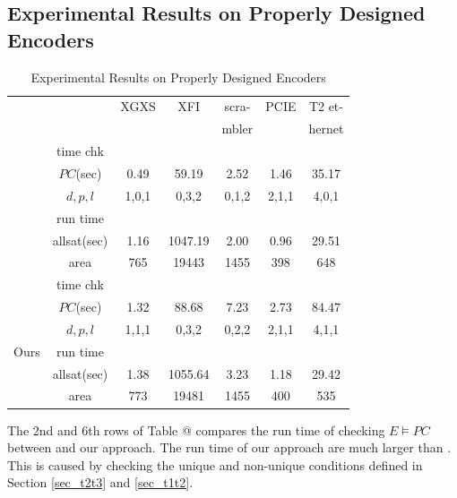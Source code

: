 \documentclass[journal]{IEEEtran}
\makeatletter
\newcommand{\Rmnum}[1]{\expandafter\@slowromancap\romannumeral #1@}
\makeatother
\begin{document}
\subsection{Experimental Results on Properly Designed Encoders}
\begin{table}[b]
\centering
\caption{Experimental Results on Properly Designed Encoders}
\begin{tabular}{|c|c|c|c|c|c|c|}
\hline
&                                        &XGXS     &XFI       &scra-     &PCIE    &T2 et-\\
&                                        &         &          &mbler     &        &hernet\\ \hline
&time chk                           &&&&&\\
&$PC$(sec)                               &0.49     &59.19     &2.52      &1.46    &35.17\\\cline{2-7}
&$d,p,l$                                 &1,0,1    &0,3,2     &0,1,2     &2,1,1   &4,0,1         \\ \cline{2-7}
\cite{ShengYuShen:iccad09}&run time      &         &          &          &        &              \\
&allsat(sec)                             &1.16     &1047.19   &2.00      &0.96    &29.51       \\\cline{2-7}
&area                                    &765      &19443     &1455      &398     &648           \\ \hline\hline
&time chk                         &&&&&\\
&$PC$(sec)                               &1.32     &88.68     &7.23      &2.73    &84.47\\\cline{2-7}
&$d,p,l$                                 &1,1,1    &0,3,2     &0,2,2     &2,1,1   &4,1,1          \\ \cline{2-7}
Ours&run time                            &         &          &          &        &              \\
&allsat(sec)                             &1.38     &1055.64   &3.23      &1.18    &29.42              \\\cline{2-7}
&area                                    &773      &19481     &1455      &400     &535          \\ \hline
\end{tabular}
\end{table}

The 2nd and 6th rows of Table \Rmnum{2} compares the run time of checking $E\vDash PC$ between \cite{ShengYuShen:iccad09} and our approach.
The run time of our approach are much larger than \cite{ShengYuShen:iccad09}.
This is caused by checking the unique and non-unique conditions defined in Section \ref{sec_t2t3} and \ref{sec_t1t2}.
\end{document}

